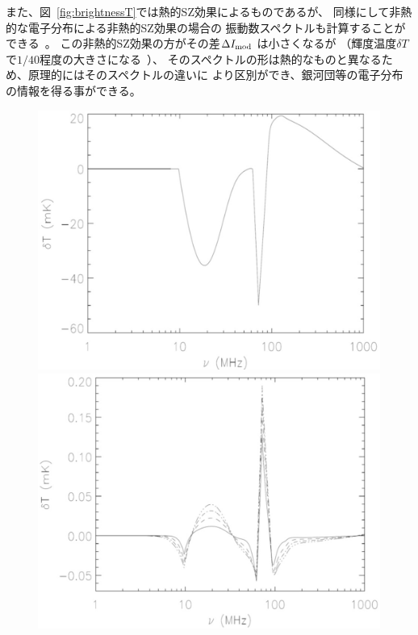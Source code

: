 また、図~\ref{fig:brightnessT}では熱的SZ効果によるものであるが、
同様にして非熱的な電子分布による非熱的SZ効果の場合の
振動数スペクトルも計算することができる~\citep{Colafrancesco2014}。
この非熱的SZ効果の方がその差$\Delta I_{\rm mod}$ は小さくなるが
（輝度温度$\delta T$ で$1/40$程度の大きさになる~\citep{Colafrancesco2014}）、
そのスペクトルの形は熱的なものと異なるため、原理的にはそのスペクトルの違いに
より区別ができ、銀河団等の電子分布の情報を得る事ができる。

\begin{figure}[t]
 \begin{minipage}{0.5\hsize}
 \begin{center}
   \includegraphics[width=1.0\linewidth]{cosmology/cluster_21cm.eps} 
 \end{center}
 \end{minipage}
 \begin{minipage}{0.5\hsize}
 \begin{center}
   \includegraphics[width=1.0\linewidth]{cosmology/cluster_SZ-21cm.eps} 

\end{center}
\end{minipage}
\end{figure}
